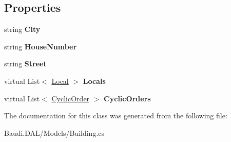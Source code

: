 \subsection*{Properties}
\begin{DoxyCompactItemize}
\item 
\hypertarget{class_baudi_1_1_d_a_l_1_1_models_1_1_building_a2a0f1475a00db1004eb542379455f8e1}{}string {\bfseries City}\label{class_baudi_1_1_d_a_l_1_1_models_1_1_building_a2a0f1475a00db1004eb542379455f8e1}

\item 
\hypertarget{class_baudi_1_1_d_a_l_1_1_models_1_1_building_aebfe1bc55b7822dbd4190c4e033c8bc9}{}string {\bfseries House\+Number}\label{class_baudi_1_1_d_a_l_1_1_models_1_1_building_aebfe1bc55b7822dbd4190c4e033c8bc9}

\item 
\hypertarget{class_baudi_1_1_d_a_l_1_1_models_1_1_building_ad8c655e6d60ba003f15bfa577da396d1}{}string {\bfseries Street}\label{class_baudi_1_1_d_a_l_1_1_models_1_1_building_ad8c655e6d60ba003f15bfa577da396d1}

\item 
\hypertarget{class_baudi_1_1_d_a_l_1_1_models_1_1_building_a1277097941acae9511097b825f251d6e}{}virtual List$<$ \hyperlink{class_baudi_1_1_d_a_l_1_1_models_1_1_local}{Local} $>$ {\bfseries Locals}\label{class_baudi_1_1_d_a_l_1_1_models_1_1_building_a1277097941acae9511097b825f251d6e}

\item 
\hypertarget{class_baudi_1_1_d_a_l_1_1_models_1_1_building_afc53fb24fbdc8765a075ff7e3bef1ee6}{}virtual List$<$ \hyperlink{class_baudi_1_1_d_a_l_1_1_models_1_1_cyclic_order}{Cyclic\+Order} $>$ {\bfseries Cyclic\+Orders}\label{class_baudi_1_1_d_a_l_1_1_models_1_1_building_afc53fb24fbdc8765a075ff7e3bef1ee6}

\end{DoxyCompactItemize}


The documentation for this class was generated from the following file\+:\begin{DoxyCompactItemize}
\item 
Baudi.\+D\+A\+L/\+Models/Building.\+cs\end{DoxyCompactItemize}
